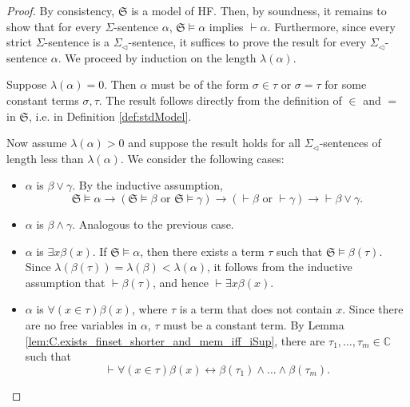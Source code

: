\begin{proof}
    By consistency, $\mathfrak{S}$ is a model of HF.
    Then, by soundness, it remains to show that for every $\Sigma$-sentence $\alpha$,
    $\mathfrak{S} \vDash \alpha$ implies $\vdash \alpha$.
    Furthermore, since every strict $\Sigma$-sentence is a $\Sigma_{\lhd}$-sentence, 
    it suffices to prove the result for every $\Sigma_{\lhd}$-sentence $\alpha$.
    We proceed by induction on the length $\lambda (\alpha)$.

    Suppose $\lambda(\alpha) = 0$. Then $\alpha$ must be of the form $\sigma \in \tau$ or 
    $\sigma = \tau$ for some constant terms $\sigma, \tau$.
    The result follows directly from the definition of ${\in}$ and ${=}$ in $\mathfrak{S}$,
    i.e. in Definition \ref{def:stdModel}.

    Now assume $\lambda(\alpha) > 0$ and suppose the result holds for all $\Sigma_{\lhd}$-sentences 
    of length less than $\lambda (\alpha)$.
    We consider the following cases:
    \begin{itemize}
        \item $\alpha$ is $\beta \lor \gamma$. By the inductive assumption,
        \begin{equation*}
            \mathfrak{S} \vDash \alpha \rightarrow 
            (\mathfrak{S} \vDash \beta \text{ or } \mathfrak{S} \vDash \gamma) \rightarrow
            (\vdash \beta \text{ or } \vdash \gamma) \rightarrow 
            \vdash \beta \lor \gamma.
        \end{equation*}
        \item $\alpha$ is $\beta \land \gamma$. Analogous to the previous case.
        \item $\alpha$ is $\exists x \beta (x)$.
        If $\mathfrak{S} \vDash \alpha$, then there exists a term $\tau$ such that
        $\mathfrak{S} \vDash \beta(\tau)$. 
        Since $\lambda(\beta(\tau)) = \lambda(\beta) < \lambda(\alpha)$, it follows from
        the inductive assumption that $\vdash \beta(\tau)$, 
        and hence $\vdash \exists x \beta (x)$.
        \item $\alpha$ is $\forall (x \in \tau) \beta(x)$, where $\tau$ is a term that does not
        contain $x$. Since there are no free variables in $\alpha$, $\tau$ must be a constant term.
        By Lemma \ref{lem:C.exists_finset_shorter_and_mem_iff_iSup}, there are 
        $\tau_1, \ldots, \tau_m \in \mathbb{C}$ such that
        $$
        \vdash \forall (x \in \tau) \beta(x) \leftrightarrow
        \beta(\tau_1) \land \ldots \land \beta(\tau_m).
$$
\end{itemize}
\end{proof}
